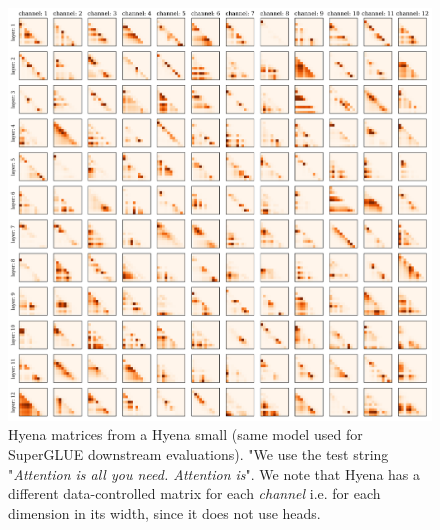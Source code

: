 \begin{figure}
    \centering
    \includegraphics[width=\linewidth]{figures/hyena_mats.png}
    \caption{Hyena matrices from a {\sf Hyena} small (same model used for SuperGLUE downstream evaluations). "We use the test string "\textit{Attention is all you need. Attention is}". We note that {\sf Hyena} has a different data-controlled matrix for each \textit{channel} i.e. for each dimension in its width, since it does not use heads.}
    \label{fig:comparisons_2}
\end{figure}
%

